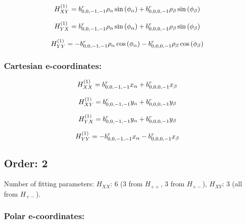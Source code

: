 \documentclass[fleqn]{article}
\begin{document}
\begin{dmath*}
H_{XY}^{(1)}= b^{r}_{0,0,-1,-1} \rho_{\alpha} \sin{\left (\phi_{\alpha} \right )} +  b^{r}_{0,0,0,-1} \rho_{\beta} \sin{\left (\phi_{\beta} \right )}\\
\end{dmath*}

\begin{dmath*}
H_{YX}^{(1)}= b^{r}_{0,0,-1,-1} \rho_{\alpha} \sin{\left (\phi_{\alpha} \right )} +  b^{r}_{0,0,0,-1} \rho_{\beta} \sin{\left (\phi_{\beta} \right )}\\
\end{dmath*}

\begin{dmath*}
H_{YY}^{(1)}=-  b^{r}_{0,0,-1,-1} \rho_{\alpha} \cos{\left (\phi_{\alpha} \right )} -  b^{r}_{0,0,0,-1} \rho_{\beta} \cos{\left (\phi_{\beta} \right )}\\
\end{dmath*}
\subsubsection*{Cartesian e-coordinates:}

\begin{dmath*}
H_{XX}^{(1)}=b^{r}_{0,0,-1,-1} x_{\alpha} + b^{r}_{0,0,0,-1} x_{\beta}\\
\end{dmath*}

\begin{dmath*}
H_{XY}^{(1)}= b^{r}_{0,0,-1,-1} y_{\alpha} +  b^{r}_{0,0,0,-1} y_{\beta}\\
\end{dmath*}

\begin{dmath*}
H_{YX}^{(1)}= b^{r}_{0,0,-1,-1} y_{\alpha} +  b^{r}_{0,0,0,-1} y_{\beta}\\
\end{dmath*}

\begin{dmath*}
H_{YY}^{(1)}=-  b^{r}_{0,0,-1,-1} x_{\alpha} -  b^{r}_{0,0,0,-1} x_{\beta}\\
\end{dmath*}
\subsection{Order: 2}
Number of fitting parameters: $H_{XX}$: $6$ ($3$ from $H_{++}$, $3$ from $H_{+-}$), $H_{XY}$: $3$ (all from $H_{+-}$).
\subsubsection*{Polar e-coordinates:}
\end{document}
